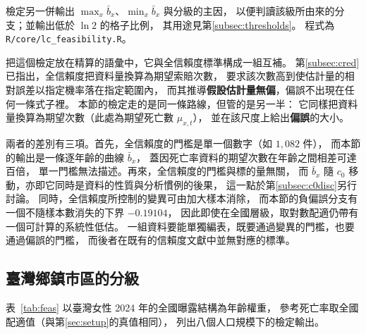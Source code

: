 \documentclass[UTF8, fontset=macnew, a4paper, 12pt]{ctexart}
\begin{document}
檢定另一併輸出 $\max_x\bar b_x$、$\min_x\bar b_x$ 與分級的主因，
以便判讀該級所由來的分支；並輸出低於 $\ln2$ 的格子比例，
其用途見第\ref{subsec:thresholds}。
程式為 \texttt{R/core/lc\_feasibility.R}。


把這個檢定放在精算的語彙中，它與全信賴度標準構成一組互補。
第\ref{subsec:cred}已指出，全信賴度把資料量換算為期望索賠次數，
要求該次數高到使估計量的相對誤差以指定機率落在指定範圍內，
而其推導\textbf{假設估計量無偏}，偏誤不出現在任何一條式子裡。
本節的檢定走的是同一條路線，但管的是另一半：
它同樣把資料量換算為期望次數（此處為期望死亡數 $\mu_{x,t}$），
並在該尺度上給出\textbf{偏誤}的大小。

兩者的差別有三項。首先，全信賴度的門檻是單一個數字（如 $1{,}082$ 件），
而本節的輸出是一條逐年齡的曲線 $\bar b_x$，
蓋因死亡率資料的期望次數在年齡之間相差可達百倍，
單一門檻無法描述。再來，全信賴度的門檻與標的量無關，
而 $\bar b_x$ 隨 $c_0$ 移動，亦即它同時是資料的性質與分析慣例的後果，
這一點於第\ref{subsec:c0disc}另行討論。
同時，全信賴度所控制的變異可由加大樣本消除，
而本節的負偏誤分支有一個不隨樣本數消失的下界 $-0.19104$，
因此即使在全國層級，取對數配適仍帶有一個可計算的系統性低估。
一組資料要能單獨編表，既要通過變異的門檻，也要通過偏誤的門檻，
而後者在既有的信賴度文獻中並無對應的標準。

\subsection{臺灣鄉鎮市區的分級}\label{subsec:grade}

表~\ref{tab:feas} 以臺灣女性 2024 年的全國曝露結構為年齡權重，
參考死亡率取全國配適值（與第\ref{sec:setup}的真值相同），
列出八個人口規模下的檢定輸出。
\end{document}
